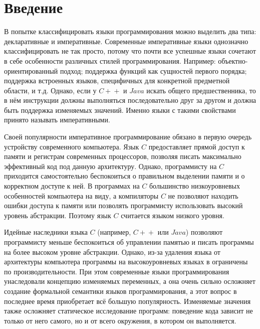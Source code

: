 \documentclass[14pt]{matmex-diploma-custom}
\begin{document}
\sloppy

\maketitle
\tableofcontents

\newpage
\section{Введение}
В попытке классифицировать языки программирования можно выделить два типа: декларативные и императивные. Современные императивные языки однозначно классифицировать не так просто, потому что почти все успешные языки сочетают в себе особенности различных стилей программирования. Например: объектно-ориентированный подход; поддержка функций как сущностей первого порядка; поддержка встроенных языков, специфичных для конкретной предметной области, и т.д. Однако, если у $C\!+\!+$ и $Java$ искать общего предшественника, то в нём инструкции должны выполняться последовательно друг за другом и должна быть поддержка изменяемых значений. Именно языки с такими свойствами принято называть императивными.

Своей популярности императивное программирование обязано в первую очередь устройству современного компьютера. Язык $C$ предоставляет прямой доступ к памяти и регистрам современных процессоров, позволяя писать максимально эффективный код под данную архитектуру. Однако, программисту на $C$ приходится самостоятельно беспокоиться о правильном выделении памяти и о корректном доступе к ней. В программах на $C$ большинство низкоуровневых особенностей компьютера на виду, а компиляторы $C$ не позволяют находить ошибки доступа к памяти или позволять программисту использовать высокий уровень абстракции. Поэтому язык $C$ считается языком низкого уровня.

Идейные наследники языка $C$ (например, $C\!+\!+$ или $Java$) позволяют программисту меньше беспокоиться об управлении памятью и писать программы на более высоком уровне абстракции. Однако, из-за удаления языка от архитектуры компьютера программы на высокоуровневых языках в ограничены по производительности. При этом современные языки программирования унаследовали концепцию изменяемых переменных, а она очень сильно осложняет создание формальной семантики языков программирования, а этот вопрос в последнее время приобретает всё большую популярность. Изменяемые значения также осложняет статическое исследование программ: поведение кода зависит не только от него самого, но и от всего окружения, в котором он выполняется.
\end{document}
